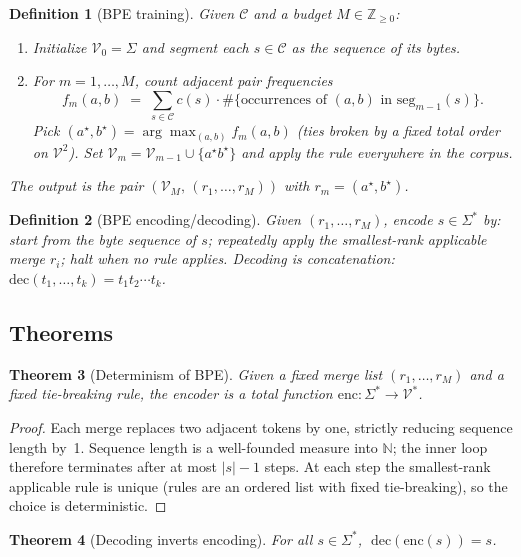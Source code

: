 \documentclass[11pt]{article}
\newtheorem{theorem}{Theorem}[section]
\newtheorem{definition}[theorem]{Definition}
\theoremstyle{remark}
\begin{document}
\begin{definition}[BPE training]
Given $\mathcal{C}$ and a budget $M \in \mathbb{Z}_{\geq 0}$:
\begin{enumerate}
\item Initialize $\mathcal{V}_0 = \Sigma$ and segment each $s \in \mathcal{C}$ as the sequence of its bytes.
\item For $m = 1, \dots, M$, count adjacent pair frequencies
\[
f_m(a,b) \;=\; \sum_{s \in \mathcal{C}} c(s) \cdot \#\{\text{occurrences of }(a,b)\text{ in }\mathrm{seg}_{m-1}(s)\}.
\]
Pick $(a^\star, b^\star) = \arg\max_{(a,b)} f_m(a,b)$ (ties broken by a fixed total order on $\mathcal{V}^2$). Set $\mathcal{V}_m = \mathcal{V}_{m-1} \cup \{a^\star b^\star\}$ and apply the rule everywhere in the corpus.
\end{enumerate}
The output is the pair $(\mathcal{V}_M,\, (r_1, \dots, r_M))$ with $r_m = (a^\star, b^\star)$.
\end{definition}

\begin{definition}[BPE encoding/decoding]
Given $(r_1, \dots, r_M)$, encode $s \in \Sigma^*$ by: start from the byte sequence of $s$; repeatedly apply the smallest-rank applicable merge $r_i$; halt when no rule applies. Decoding is concatenation: $\mathrm{dec}(t_1, \dots, t_k) = t_1 t_2 \cdots t_k$.
\end{definition}

\subsection*{Theorems}

\begin{theorem}[Determinism of BPE]
Given a fixed merge list $(r_1, \dots, r_M)$ and a fixed tie-breaking rule, the encoder is a total function $\mathrm{enc}: \Sigma^* \to \mathcal{V}^*$.
\end{theorem}

\begin{proof}
Each merge replaces two adjacent tokens by one, strictly reducing sequence length by~1. Sequence length is a well-founded measure into $\mathbb{N}$; the inner loop therefore terminates after at most $|s|-1$ steps. At each step the smallest-rank applicable rule is unique (rules are an ordered list with fixed tie-breaking), so the choice is deterministic. \qedhere
\end{proof}

\begin{theorem}[Decoding inverts encoding]
For all $s \in \Sigma^*$, $\;\mathrm{dec}(\mathrm{enc}(s)) = s$.
\end{theorem}
\end{document}
